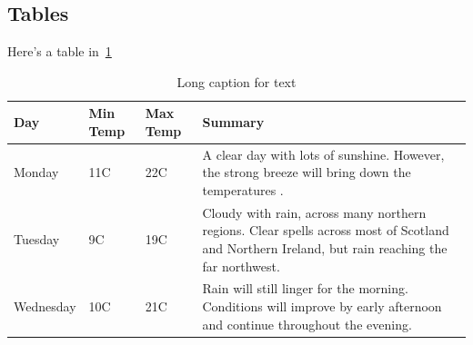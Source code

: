 \subsection{Tables}\label{ssec:tables}

Here's a table in~\cref{tab:table}

\begin{table}
    \centering
    \begin{tabular}{ | l | l | l | p{5cm} |}
    \hline
    Day & Min Temp & Max Temp & Summary \\ 
    \hline
    Monday & 11C & 22C & A clear day with lots of sunshine.  
    However, the strong breeze will bring down the temperatures . \\ 
    \hline
    Tuesday & 9C & 19C & Cloudy with rain, across many northern regions. Clear spells
    across most of Scotland and Northern Ireland, 
    but rain reaching the far northwest. \hfill \\ 
    \hline
    Wednesday & 10C & 21C & Rain will still linger for the morning. \hfill 
    Conditions will improve by early afternoon and continue 
    throughout the evening.\\
    \hline
    \end{tabular}
    \caption[Short caption for table]{Long caption for text \label{tab:table}}
\end{table}

